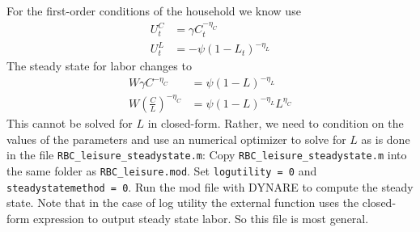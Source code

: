 \begin{enumerate}
          \begin{solution}
              For the first-order conditions of the household we know use
              \begin{align*}
                  U_t^C & = \gamma C_t^{-\eta_C}     \\
                  U_t^L & = - \psi (1-L_t)^{-\eta_L}
              \end{align*}
              The steady state for labor changes to
              \begin{align*}
                  W \gamma C^{-\eta_C}                  & = \psi(1-L)^{-\eta_L}           \\
                  W  \left(\frac{C}{L}\right)^{-\eta_C} & = \psi(1-L)^{-\eta_L}L^{\eta_C}
              \end{align*}
              This cannot be solved for $L$ in closed-form. Rather, we need to condition on the values of the parameters and use an numerical optimizer to solve for $L$ as is done in the file \texttt{RBC\_leisure\_steadystate.m}:
              Copy \texttt{RBC\_leisure\_steadystate.m} into the same folder as \texttt{RBC\_leisure.mod}. Set \texttt{logutility = 0} and \texttt{steadystatemethod = 0}. Run the mod file with DYNARE to compute the steady state. Note that in the case of log utility the external function uses the closed-form expression to output steady state labor. So this file is most general.
          \end{solution}
\end{enumerate}
